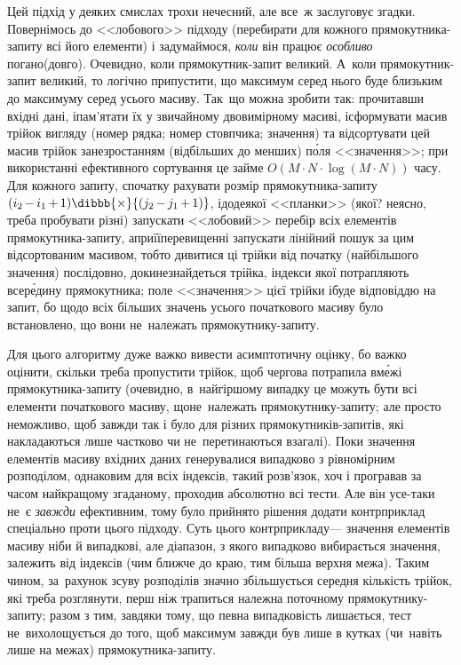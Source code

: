Цей підхід у деяких смислах трохи нечесний, але все~ж заслуговує згадки. Повернімось до <<лобового>> підходу (перебирати для кожного прямокутника-запиту всі його елементи) і задумаймося, \emph{коли} він працює \emph{особливо} погано\nolinebreak[2] (довго). Очевидно, коли прямокутник-запит великий. А~коли прямокутник-запит великий, то логічно припустити, що максимум серед нього буде близьким до максимуму серед усього масиву. Так~що можна зробити так: прочитавши вхідні дані, і\nolinebreak[3] пам'ятати їх у звичайному двовимірному масиві, і\nolinebreak[3] сформувати масив трійок вигляду (номер рядка; номер стовпчика; значення) та відсортувати цей масив трійок за\nolinebreak[2] незро\-с\-та\-н\-ням (від\nolinebreak[2] більших до менших) п\'{о}ля <<значення>>; при використанні ефективного сортування це займе $O(M{\cdot}N{\cdot}\log{(M{\cdot}N)})$ часу. Для кожного запиту, спочатку рахувати розмір прямокутника-запиту ${(i_2\,{-}\,i_1\,{+}\,1)}\dibbb{{\times}}{(j_2\,{-}\,j_1\,{+}\,1)}$, і\nolinebreak[3] до\nolinebreak[3] деякої <<планки>> (якої? \mbox{неясно}, треба пробувати різні) запускати <<лобовий>> перебір всіх елементів прямокутника-запиту, а\nolinebreak[3] при\nolinebreak[2] її\nolinebreak[2] перевищенні запускати лінійний пошук за цим відсортованим масивом, тобто дивитися ці трійки від початку (найбільшого значення) послідовно, доки\nolinebreak[3] не\nolinebreak[3] знайдеться трійка, індекси якої потрапляють всер\'{е}дину прямокутника; поле <<значення>> цієї трійки і\nolinebreak[3] буде відповіддю на запит, бо щодо всіх більших значень усього початкового масиву було встановлено, що вони не~належать прямокутнику-запиту.

Для цього алгоритму дуже важко вивести асимптотичну оцінку, бо важко оцінити, скільки треба пропустити трійок, щоб чергова потрапила в\nolinebreak[3] м\'{е}жі прямокутника-запиту (очевидно, в~найгіршому випадку це можуть бути всі елементи початкового масиву, що\nolinebreak[2] не~належать прямокутнику-запиту; але просто неможливо, щоб завжди так і було для різних прямокутників-запитів, які накладаються лише частково чи не~перетинаються взагалі). Поки значення елементів масиву вхідних даних генерувалися випадково з рівномірним розподілом, однаковим для всіх індексів, такий розв'язок, хоч і програвав за часом найкращому згаданому, проходив абсолютно всі тести. Але він усе-таки не~є \emph{завжди} ефективним, тому було прийнято рішення додати контрприклад спеціально проти цього підходу. Суть цього контрприкладу\nolinebreak[3] --- значення елементів масиву ніби й випадкові, але діапазон, з якого випадково вибирається значення, залежить від індексів (чим ближче до краю, тим більша верхня межа). Таким чином, за~рахунок зсуву розподілів значно збільшується середня кількість трійок, які треба розглянути, перш ніж трапиться належна поточному прямокутнику-запиту; разом з тим, завдяки тому, що певна випадковість лишається, тест не~вихолощується до того, щоб максимум завжди був лише в кутках (чи~навіть лише на межах) прямокутника-запиту.


